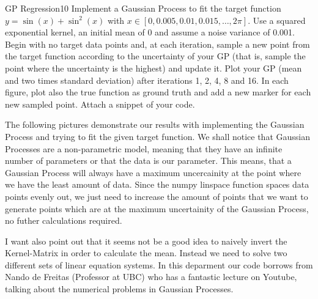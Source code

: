 \newif\ifvimbug
\vimbugfalse

\ifvimbug

\fi

\begin{questions}


\begin{question}{GP Regression}{10}
Implement a Gaussian Process to fit the target function $y = \sin(x) + \sin^2(x)$ with $x \in [0, 0.005, 0.01, 0.015, \ldots, 2\pi]$. Use a squared exponential kernel, an initial mean of 0 and assume a noise variance of 0.001. Begin with no target data points and, at each iteration, sample a new point from the target function according to the uncertainty of your GP (that is, sample the point where the uncertainty is the highest) and update it. Plot your GP (mean and two times standard deviation) after iterations 1, 2, 4, 8 and 16.
In each figure, plot also the true function as ground truth and add a new marker for each new sampled point. Attach a snippet of your code.

\begin{answer}
The following pictures demonstrate our results with implementing the Gaussian Process and trying to fit the given target function. We shall notice that Gaussian Processes are a non-parametric model, meaning that they have an infinite number of parameters or that the data is our parameter. This means, that a Gaussian Process will always have a maximum uncercainity at the point where we have the least amount of data. Since the numpy linspace function spaces data points evenly out, we just need to increase the amount of points that we want to generate points which are at the maximum uncertainity of the Gaussian Process, no futher calculations required. 

I want also point out that it seems not be a good idea to naively invert the Kernel-Matrix in order to calculate the mean. Instead we need to solve two different sets of linear equation systems. In this deparment our code borrows from Nando de Freitas (Professor at UBC) who has a fantastic lecture on Youtube, talking about the numerical problems in Gaussian Processes.
\end{answer}


\end{question}
\end{questions}
